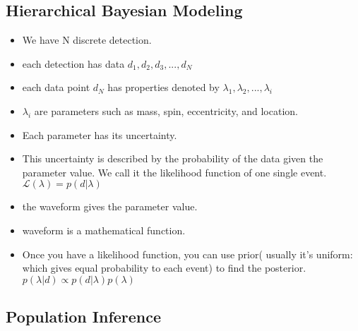\documentclass[twocolumn,prd,nofootinbib]{revtex4}
\begin{document}
\subsection{Hierarchical Bayesian Modeling}
\begin{itemize}
    \item We have N discrete detection.
    \item each detection has data $d_1,d_2,d_3,...,d_N$
    \item each data point $d_N$ has properties denoted by $\lambda_1,\lambda_2,...,\lambda_i$
    \item  $ \lambda_i$ are parameters such as mass, spin, eccentricity, and location.
    \item Each parameter has its uncertainty.
    \item This uncertainty is described by the probability of the data given the parameter value. We call it the likelihood function of one single event. $\mathcal{L}(\lambda) = p(d|\lambda)$
    \item the waveform gives the parameter value.
    \item waveform is a mathematical function.
    \item Once you have a likelihood function, you can use prior( usually it's uniform: which gives equal probability to each event) to find the posterior. $p(\lambda|d) \propto p(d|\lambda) p(\lambda)$  
    
\end{itemize}


\subsection{Population Inference}
\end{document}
